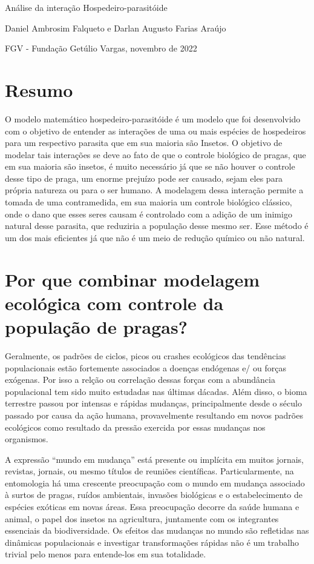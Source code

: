 \begin{center}
    {\huge  Análise da interação Hospedeiro-parasitóide}
    
    \medskip
    
    {\large Daniel Ambrosim Falqueto e Darlan Augusto Farias Araújo}
    
    \medskip
    
    FGV - Fundação Getúlio Vargas, novembro de 2022
\end{center}

\section{Resumo}

O modelo matemático hospedeiro-parasitóide é um modelo que foi desenvolvido com o objetivo de entender as interações de uma ou mais espécies de hospedeiros para um respectivo parasita que em sua maioria são Insetos. O objetivo de modelar tais interações se deve ao fato de que o controle biológico de pragas, que em sua maioria são insetos, é muito necessário já que se não houver o controle desse tipo de praga, um enorme prejuízo pode ser causado, sejam eles para própria natureza ou para o ser humano. A modelagem dessa interação permite a tomada de uma contramedida, em sua maioria um controle biológico clássico, onde o dano que esses seres causam é controlado com a adição de um inimigo natural desse parasita, que reduziria a população desse mesmo ser. Esse método é um dos mais eficientes já que não é um meio de redução químico ou não natural.

\section{Por que combinar modelagem ecológica com controle da população de pragas?}

Geralmente, os padrões de ciclos, picos ou crashes ecológicos das tendências populacionais estão fortemente associados a doenças endógenas e/
ou forças exógenas. Por isso a relção ou correlação dessas forças com a abundância populacional tem sido muito estudadas nas últimas dácadas. Além disso, o bioma terrestre passou por intensas e rápidas mudanças, principalmente desde o século passado por causa da ação humana, provavelmente resultando em novos padrões ecológicos como resultado da pressão exercida por essas mudanças nos organismos.

A expressão “mundo em mudança” está presente ou implícita em muitos jornais, revistas, jornais, ou mesmo títulos de reuniões científicas. Particularmente, na entomologia há uma crescente preocupação com o mundo em mudança associado à surtos de pragas, ruídos ambientais, invasões biológicas e o estabelecimento de espécies exóticas em novas áreas. Essa preocupação decorre da saúde humana e animal, o papel dos insetos na agricultura, juntamente com os integrantes essenciais da biodiversidade. Os efeitos das mudanças no mundo são refletidas nas dinâmicas populacionais e investigar transformações rápidas não é um trabalho trivial pelo menos para entende-los em sua totalidade.


